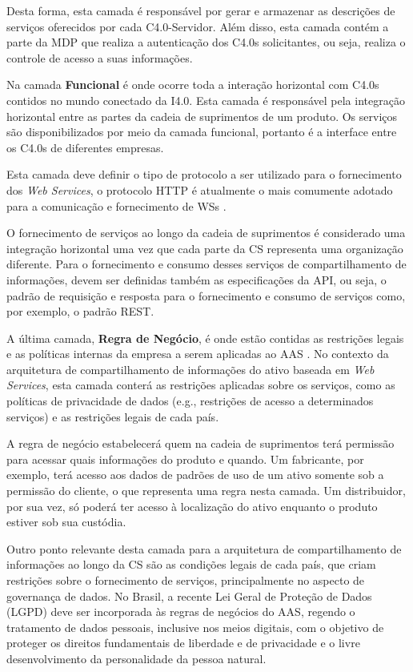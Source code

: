 	Desta forma, esta camada é responsável por gerar e armazenar as descrições de serviços oferecidos por cada C4.0-Servidor. Além disso, esta camada contém a parte da MDP que realiza a autenticação dos C4.0s solicitantes, ou seja, realiza o controle de acesso a suas informações.
	
	Na camada \textbf{Funcional} é onde ocorre toda a interação horizontal com C4.0s contidos no mundo conectado da I4.0. Esta camada é responsável pela integração horizontal entre as partes da cadeia de suprimentos de um produto. Os serviços são disponibilizados por meio da camada funcional, portanto é a interface entre os C4.0s de diferentes empresas.
	
	Esta camada deve definir o tipo de protocolo a ser utilizado para o fornecimento dos \textit{Web Services}, o protocolo HTTP é atualmente o mais comumente adotado para a comunicação e fornecimento de WSs \cite{gruner2016restful}. %
	
	O fornecimento de serviços ao longo da cadeia de suprimentos é considerado uma integração horizontal uma vez que cada parte da CS representa uma organização diferente. Para o fornecimento e consumo desses serviços de compartilhamento de informações, devem ser definidas também as especificações da API, ou seja, o padrão de requisição e resposta para o fornecimento e consumo de serviços como, por exemplo, o padrão REST.
			
	A última camada, \textbf{Regra de Negócio}, é onde estão contidas as restrições legais e as políticas internas da empresa a serem aplicadas ao AAS \cite{adolphs2015rami}. No contexto da arquitetura de compartilhamento de informações do ativo baseada em \textit{Web Services}, esta camada conterá as restrições aplicadas sobre os serviços, como as políticas de privacidade de dados (e.g., restrições de acesso a determinados serviços) e as restrições legais de cada país.
	
	A regra de negócio estabelecerá quem na cadeia de suprimentos terá permissão para acessar quais informações do produto e quando. Um fabricante, por exemplo, terá acesso aos dados de padrões de uso de um ativo somente sob a permissão do cliente, o que representa uma regra nesta camada. Um distribuidor, por sua vez, só poderá ter acesso à localização do ativo enquanto o produto estiver sob sua custódia.
	
	Outro ponto relevante desta camada para a arquitetura de compartilhamento de informações ao longo da CS são as condições legais de cada país, que criam restrições sobre o fornecimento de serviços, principalmente no aspecto de governança de dados. No Brasil, a recente Lei Geral de Proteção de Dados (LGPD) \cite{brasil2018lgpd} deve ser incorporada às regras de negócios do AAS, regendo o tratamento de dados pessoais, inclusive nos meios digitais, com o objetivo de proteger os direitos fundamentais de liberdade e de privacidade e o livre desenvolvimento da personalidade da pessoa natural.
	
